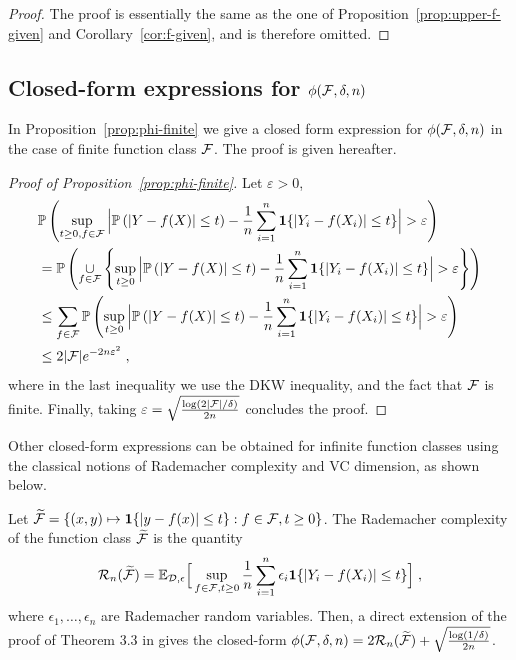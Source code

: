 \begin{proof}
    The proof is essentially the same as the one of Proposition~\ref{prop:upper-f-given} and Corollary~\ref{cor:f-given}, and is therefore omitted.
\end{proof}


\subsection{Closed-form expressions for ${\phi(\mathcal{F},\delta,n)}$}
\label{sec:closed-form-phi}
In Proposition~\ref{prop:phi-finite} we give a closed form expression for ${\phi(\mathcal{F},\delta,n)}$ in the case of finite function class $\mathcal{F}$. The proof is given hereafter.


\begin{proof}[Proof of Proposition~\ref{prop:phi-finite}]
    Let $\varepsilon>0$, 
    \begin{align*}
        & \IP\left(\sup_{t\geq 0, f\in\calF}\Big|\IP\left(|Y-f(X)|\leq t\right) - \frac{1}{n}\sum_{i=1}^n\1\{|Y_i-f(X_i)|\leq t\}\Big|> \varepsilon\right) \\
         & =\IP\left(\underset{f\in\calF}{\cup}\left\{\sup_{t\geq 0}\Big|\IP\left(|Y-f(X)|\leq t\right) - \frac{1}{n}\sum_{i=1}^n\1\{|Y_i-f(X_i)|\leq t\}\Big|> \varepsilon\right\}\right) \\
         & \leq \sum_{f\in\calF}\IP\left(\sup_{t\geq 0}\Big|\IP\left(|Y-f(X)|\leq t\right) - \frac{1}{n}\sum_{i=1}^n\1\{|Y_i-f(X_i)|\leq t\}\Big|> \varepsilon\right) \\
         & \leq 2|\calF|e^{-2n\varepsilon^2}\;,
    \end{align*}
    where in the last inequality we use the DKW inequality, and the fact that $\mathcal{F}$ is finite. Finally, taking $\varepsilon = \sqrt{\frac{\log(2|\mathcal{F}|/\delta)}{2n}}$ concludes the proof.
\end{proof}

Other closed-form expressions can be obtained for infinite function classes using the classical notions of Rademacher complexity and VC dimension, as shown below.

Let $\widetilde{\mathcal{F}} = \{(x,y)\mapsto \mathbf{1}\{|y-f(x)|\leq t\} : f\in\mathcal{F}, t\geq 0 \}$. The Rademacher complexity of the function class $\widetilde{\mathcal{F}}$ is the quantity 
\begin{equation*}
    {\cal R}_n(\widetilde{\mathcal{F}})=\mathbb{E}_{{\cal D},\epsilon}\Big[\sup_{f\in\mathcal{F},t\geq 0}\frac{1}{n}\sum_{i=1}^n\epsilon_i\mathbf{1}\{|Y_i-f(X_i)|\leq t\}\Big]\;,
\end{equation*}
where $\epsilon_1,\ldots,\epsilon_n$ are Rademacher random variables. Then, a direct extension of the proof of Theorem 3.3 in \citet{mohri2018foundations} gives the closed-form ${\phi(\mathcal{F},\delta,n)} = 2{\cal R}_n(\widetilde{\mathcal{F}})+\sqrt{\frac{\log(1/\delta)}{2n}}$. %

